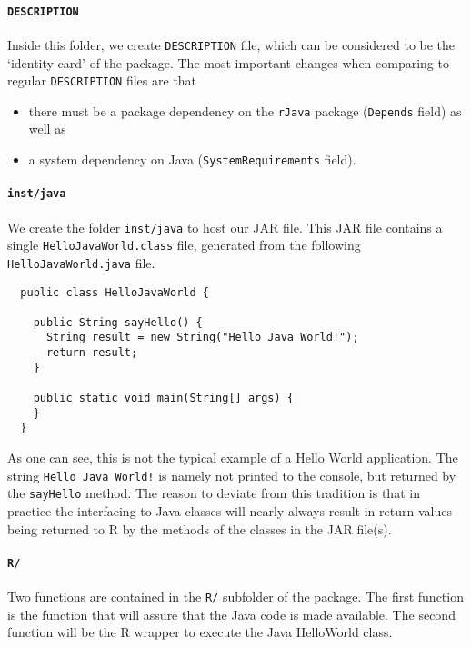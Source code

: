 \documentclass[a4paper, 11pt]{article}
\begin{document}
\paragraph{\texttt{DESCRIPTION}}

Inside this folder, we create \texttt{DESCRIPTION} file, 
which can be considered to be the `identity card'
of the package. The most important changes when comparing to 
regular \texttt{DESCRIPTION} files are that 
\begin{itemize}
  \item there must be a package dependency on the
     \texttt{rJava} package (\texttt{Depends} field) as well as 
  \item a system dependency on Java (\texttt{SystemRequirements} field). 
\end{itemize}

\paragraph{\texttt{inst/java}}

We create the folder \verb|inst/java| to host our JAR file. This JAR file
contains a single \texttt{HelloJavaWorld.class} file, generated from the following
\texttt{HelloJavaWorld.java} file.

\begin{verbatim}
  public class HelloJavaWorld {
   
    public String sayHello() {
      String result = new String("Hello Java World!");
      return result;
    }
  
    public static void main(String[] args) {
    }
  } 
\end{verbatim}

As one can see, this is not the typical example of a Hello World application.
The string \texttt{Hello Java World!} is namely not printed to the console,
but returned by the \texttt{sayHello} method. The reason to deviate from this
tradition is that in practice the interfacing to Java classes will nearly 
always result in return values being returned to R by the methods of the
classes in the JAR file(s). 
 

\paragraph{\texttt{R/}}

Two functions are contained in the \texttt{R/} subfolder of the package.
The first function is the function that will assure that the
Java code is made available. The second function will be the
R wrapper to execute the Java HelloWorld class.
\end{document}
